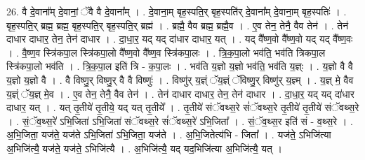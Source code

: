 \documentclass[17pt]{extarticle}
\begin{document}
26. वै दे॒वाना᳚म् दे॒वानां॒ ॅवै वै दे॒वाना᳚म् । . दे॒वाना॒म् बृह॒स्पति॒र् बृह॒स्पति॑र् दे॒वाना᳚म् दे॒वाना॒म् बृह॒स्पतिः॑ । . बृह॒स्पति॒र् ब्रह्म॒ ब्रह्म॒ बृह॒स्पति॒र् बृह॒स्पति॒र् ब्रह्म॑ । . ब्रह्मै॒ वैव ब्रह्म॒ ब्रह्मै॒व । . ए॒व तेन॒ तेनै॒ वैव तेन॑ । . तेन॑ दाधार दाधार॒ तेन॒ तेन॑ दाधार । . दा॒धा॒र॒ यद् यद् दा॑धार दाधार॒ यत् । . यद् वै᳚ष्ण॒वो वै᳚ष्ण॒वो यद् यद् वै᳚ष्ण॒वः । . वै॒ष्ण॒व स्त्रि॑कपा॒ल स्त्रि॑कपा॒लो वै᳚ष्ण॒वो वै᳚ष्ण॒व स्त्रि॑कपा॒लः । . त्रि॒क॒पा॒लो भव॑ति॒ भव॑ति त्रिकपा॒ल स्त्रि॑कपा॒लो भव॑ति । . त्रि॒क॒पा॒ल इति॑ त्रि - क॒पा॒लः । . भव॑ति य॒ज्ञो य॒ज्ञो भव॑ति॒ भव॑ति य॒ज्ञ्ः । . य॒ज्ञो वै वै य॒ज्ञो य॒ज्ञो वै । . वै विष्णु॒र् विष्णु॒र् वै वै विष्णुः॑ । . विष्णु॑र् य॒ज्ञ्ं ॅय॒ज्ञ्ं ॅविष्णु॒र् विष्णु॑र् य॒ज्ञ्म् । . य॒ज्ञ् मे॒ वैव य॒ज्ञ्ं ॅय॒ज्ञ् मे॒व । . ए॒व तेन॒ तेनै॒ वैव तेन॑ । . तेन॑ दाधार दाधार॒ तेन॒ तेन॑ दाधार । . दा॒धा॒र॒ यद् यद् दा॑धार दाधार॒ यत् । . यत् तृ॒तीये॑ तृ॒तीये॒ यद् यत् तृ॒तीये᳚ । . तृ॒तीये॑ संॅवथ्स॒रे सं॑ॅवथ्स॒रे तृ॒तीये॑ तृ॒तीये॑ संॅवथ्स॒रे । . सं॒ॅव॒थ्स॒रे॑ ऽभि॒जिता॑ ऽभि॒जिता॑ संॅवथ्स॒रे सं॑ॅवथ्स॒रे॑ ऽभि॒जिता᳚ । . सं॒ॅव॒थ्स॒र इति॑ सं - व॒थ्स॒रे । . अ॒भि॒जिता॒ यज॑ते॒ यज॑ते ऽभि॒जिता॑ ऽभि॒जिता॒ यज॑ते । . अ॒भि॒जितेत्य॑भि - जिता᳚ । . यज॑ते॒ ऽभिजि॑त्या अ॒भिजि॑त्यै॒ यज॑ते॒ यज॑ते॒ ऽभिजि॑त्यै । . अ॒भिजि॑त्यै॒ यद् यद॒भिजि॑त्या अ॒भिजि॑त्यै॒ यत् । \newline
\end{document}
